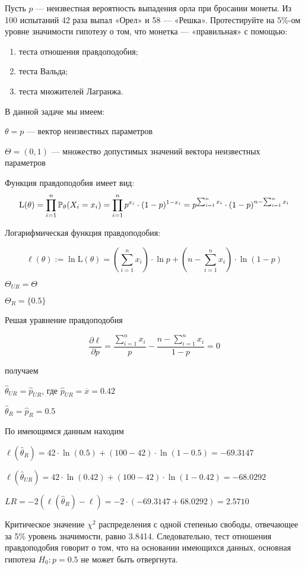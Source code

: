 \begin{problem}
Пусть $p$ — неизвестная вероятность выпадения орла при бросании монеты. Из 100 испытаний  42 раза выпал «Орел» и 58 — «Решка». Протестируйте на 5\%-ом уровне значимости гипотезу о том, что монетка — «правильная» с помощью:
\begin{enumerate}
\item теста отношения правдоподобия;
\item теста Вальда;
\item теста множителей Лагранжа.
\end{enumerate}


\begin{sol}
В данной задаче мы имеем:

$\theta = p$ — вектор неизвестных параметров

$\Theta = (0, 1)$ — множество допустимых значений вектора неизвестных параметров

Функция правдоподобия имеет вид:
\[\text{L}(\theta) = \prod_{i=1}^n \P_{\theta}(X_i = x_i) = \prod_{i=1}^n p^{x_i} \cdot (1-p)^{1-x_i} = p^{\sum_{i=1}^n x_i} \cdot (1-p)^{n - \sum_{i=1}^n x_i}\]

Логарифмическая функция правдоподобия:

\[\ell(\theta) := \ln \text{L}(\theta) = \left( \sum_{i=1}^n x_i \right) \cdot \ln p + \left(n - \sum_{i=1}^n x_i \right) \cdot \ln (1 - p)\]

$\Theta_{UR} = \Theta$

$\Theta_{R} = \{0.5\}$

Решая уравнение правдоподобия

\[\frac{\partial \ell}{\partial p} = \frac{\sum_{i=1}^n x_i}{p} - \frac{n - \sum_{i=1}^n x_i}{1 - p} = 0\]

получаем

$\hat{\theta}_{UR} = \hat{p}_{UR}$, где $\hat{p}_{UR} = \overline{x} = 0.42$

$\hat{\theta}_{R} = \hat{p}_{R} = 0.5$

По имеющимся данным находим

$\ell(\hat{\theta}_{R}) = 42 \cdot \ln(0.5) + (100-42) \cdot \ln(1-0.5) = -69.3147$

$\ell(\hat{\theta}_{UR}) = 42 \cdot \ln(0.42) + (100-42) \cdot \ln(1-0.42) = -68.0292$

$LR = -2(\ell(\hat{\theta}_{R}) - \ell) = -2 \cdot (-69.3147 + 68.0292) = 2.5710$

Критическое значение $\chi^2$ распределения с одной степенью свободы, отвечающее за 5\% уровень значимости, равно 3.8414. Следовательно, тест отношения правдоподобия говорит о том, что на основании имеющихся данных, основная гипотеза $H_0: p = 0.5$ не может быть отвергнута.


\end{sol}
\end{problem}

